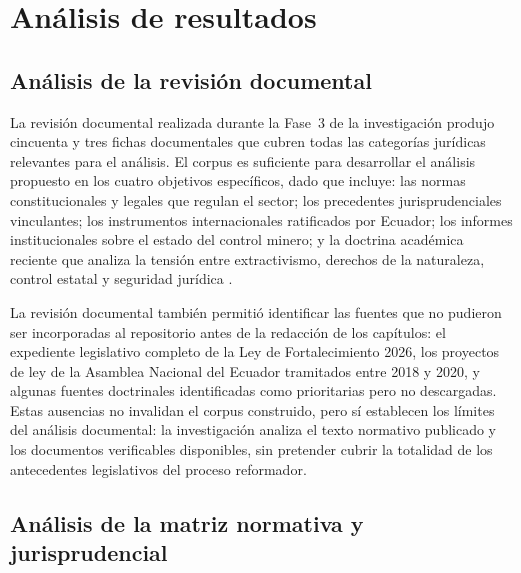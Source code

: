 \section{Análisis de resultados}

\subsection{Análisis de la revisión documental}

La revisión documental realizada durante la Fase~3 de la investigación produjo cincuenta y tres fichas documentales que cubren todas las categorías jurídicas relevantes para el análisis. El corpus es suficiente para desarrollar el análisis propuesto en los cuatro objetivos específicos, dado que incluye: las normas constitucionales y legales que regulan el sector; los precedentes jurisprudenciales vinculantes; los instrumentos internacionales ratificados por Ecuador; los informes institucionales sobre el estado del control minero; y la doctrina académica reciente que analiza la tensión entre extractivismo, derechos de la naturaleza, control estatal y seguridad jurídica \parencite{grefa_valencia_2021,ochoa_jimenez_2024,peck_et_al_2024,sanchez_romero_et_al_2026,medina_garcia_2026}.

La revisión documental también permitió identificar las fuentes que no pudieron ser incorporadas al repositorio antes de la redacción de los capítulos: el expediente legislativo completo de la Ley de Fortalecimiento 2026, los proyectos de ley de la Asamblea Nacional del Ecuador tramitados entre 2018 y 2020, y algunas fuentes doctrinales identificadas como prioritarias pero no descargadas. Estas ausencias no invalidan el corpus construido, pero sí establecen los límites del análisis documental: la investigación analiza el texto normativo publicado y los documentos verificables disponibles, sin pretender cubrir la totalidad de los antecedentes legislativos del proceso reformador.

\subsection{Análisis de la matriz normativa y jurisprudencial}
\label{sec:analisis_normativa}

